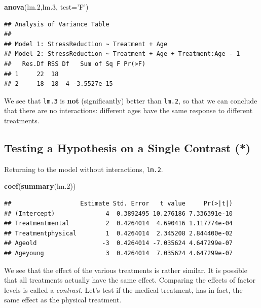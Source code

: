 \documentclass[]{book}
\newenvironment{Shaded}{\begin{snugshade}}{\end{snugshade}}
\newcommand{\DataTypeTok}[1]{\textcolor[rgb]{0.13,0.29,0.53}{#1}}
\newcommand{\FloatTok}[1]{\textcolor[rgb]{0.00,0.00,0.81}{#1}}
\newcommand{\KeywordTok}[1]{\textcolor[rgb]{0.13,0.29,0.53}{\textbf{#1}}}
\newcommand{\NormalTok}[1]{#1}
\newcommand{\StringTok}[1]{\textcolor[rgb]{0.31,0.60,0.02}{#1}}
\theoremstyle{definition}
\theoremstyle{definition}
\theoremstyle{definition}
\theoremstyle{remark}
\begin{document}
\begin{Shaded}
\begin{Highlighting}[]
\KeywordTok{anova}\NormalTok{(lm}\FloatTok{.2}\NormalTok{,lm}\FloatTok{.3}\NormalTok{, }\DataTypeTok{test=}\StringTok{'F'}\NormalTok{)}
\end{Highlighting}
\end{Shaded}

\begin{verbatim}
## Analysis of Variance Table
## 
## Model 1: StressReduction ~ Treatment + Age
## Model 2: StressReduction ~ Treatment + Age + Treatment:Age - 1
##   Res.Df RSS Df   Sum of Sq F Pr(>F)
## 1     22  18                        
## 2     18  18  4 -3.5527e-15
\end{verbatim}

We see that \texttt{lm.3} is \textbf{not} (significantly) better than \texttt{lm.2}, so that we can conclude that there are no interactions: different ages have the same response to different treatments.

\hypertarget{testing-a-hypothesis-on-a-single-contrast}{%
\subsection{Testing a Hypothesis on a Single Contrast (*)}\label{testing-a-hypothesis-on-a-single-contrast}}

Returning to the model without interactions, \texttt{lm.2}.

\begin{Shaded}
\begin{Highlighting}[]
\KeywordTok{coef}\NormalTok{(}\KeywordTok{summary}\NormalTok{(lm}\FloatTok{.2}\NormalTok{))}
\end{Highlighting}
\end{Shaded}

\begin{verbatim}
##                   Estimate Std. Error   t value     Pr(>|t|)
## (Intercept)              4  0.3892495 10.276186 7.336391e-10
## Treatmentmental          2  0.4264014  4.690416 1.117774e-04
## Treatmentphysical        1  0.4264014  2.345208 2.844400e-02
## Ageold                  -3  0.4264014 -7.035624 4.647299e-07
## Ageyoung                 3  0.4264014  7.035624 4.647299e-07
\end{verbatim}

We see that the effect of the various treatments is rather similar.
It is possible that all treatments actually have the same effect.
Comparing the effects of factor levels is called a \emph{contrast}.
Let's test if the medical treatment, has in fact, the same effect as the physical treatment.
\end{document}
